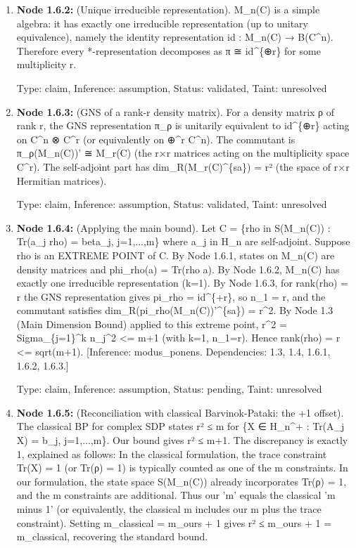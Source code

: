 \documentclass{article}
\begin{document}
\begin{enumerate}
\begin{enumerate}
  Type: claim, Inference: assumption, Status: validated, Taint: unresolved

\item \textbf{Node 1.6.2:} (Unique irreducible representation). M\_n(C) is a simple algebra: it has exactly one irreducible representation (up to unitary equivalence), namely the identity representation id : M\_n(C) → B(C\textasciicircum{}n). Therefore every *-representation decomposes as π ≅ id\textasciicircum{}\{⊕r\} for some multiplicity r.

  Type: claim, Inference: assumption, Status: validated, Taint: unresolved

\item \textbf{Node 1.6.3:} (GNS of a rank-r density matrix). For a density matrix ρ of rank r, the GNS representation π\_ρ is unitarily equivalent to id\textasciicircum{}\{⊕r\} acting on C\textasciicircum{}n ⊗ C\textasciicircum{}r (or equivalently on ⊕\textasciicircum{}r C\textasciicircum{}n). The commutant is π\_ρ(M\_n(C))' ≅ M\_r(C) (the r×r matrices acting on the multiplicity space C\textasciicircum{}r). The self-adjoint part has dim\_R(M\_r(C)\textasciicircum{}\{sa\}) = r² (the space of r×r Hermitian matrices).

  Type: claim, Inference: assumption, Status: validated, Taint: unresolved

\item \textbf{Node 1.6.4:} (Applying the main bound). Let C = \{rho in S(M\_n(C)) : Tr(a\_j rho) = beta\_j, j=1,...,m\} where a\_j in H\_n are self-adjoint. Suppose rho is an EXTREME POINT of C. By Node 1.6.1, states on M\_n(C) are density matrices and phi\_rho(a) = Tr(rho a). By Node 1.6.2, M\_n(C) has exactly one irreducible representation (k=1). By Node 1.6.3, for rank(rho) = r the GNS representation gives pi\_rho = id\textasciicircum{}\{+r\}, so n\_1 = r, and the commutant satisfies dim\_R(pi\_rho(M\_n(C))'\textasciicircum{}\{sa\}) = r\textasciicircum{}2. By Node 1.3 (Main Dimension Bound) applied to this extreme point, r\textasciicircum{}2 = Sigma\_\{j=1\}\textasciicircum{}k n\_j\textasciicircum{}2 <= m+1 (with k=1, n\_1=r). Hence rank(rho) = r <= sqrt(m+1). [Inference: modus\_ponens. Dependencies: 1.3, 1.4, 1.6.1, 1.6.2, 1.6.3.]

  Type: claim, Inference: assumption, Status: pending, Taint: unresolved

\item \textbf{Node 1.6.5:} (Reconciliation with classical Barvinok-Pataki: the +1 offset). The classical BP for complex SDP states r² ≤ m for \{X ∈ H\_n\textasciicircum{}+ : Tr(A\_j X) = b\_j, j=1,...,m\}. Our bound gives r² ≤ m+1. The discrepancy is exactly 1, explained as follows: In the classical formulation, the trace constraint Tr(X) = 1 (or Tr(ρ) = 1) is typically counted as one of the m constraints. In our formulation, the state space S(M\_n(C)) already incorporates Tr(ρ) = 1, and the m constraints are additional. Thus our 'm' equals the classical 'm minus 1' (or equivalently, the classical m includes our m plus the trace constraint). Setting m\_classical = m\_ours + 1 gives r² ≤ m\_ours + 1 = m\_classical, recovering the standard bound.


\end{enumerate}
\end{enumerate}
\end{document}

